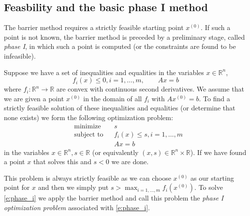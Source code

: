 \documentclass[11pt]{amsart}
\theoremstyle{definition}
\theoremstyle{remark}
\begin{document}
    \subsection{Feasbility and the basic phase I method}
        The barrier method requires a strictly feasible starting point $x^{(0)}$. If such a point is not known, the barrier method is preceded by a preliminary stage, called \emph{phase I}, in which such a point is computed (or the constraints are found to be infeasible).

        Suppose we have a set of inequalities and equalities in the variables $x \in \mathbb{R}^n$,
        \begin{equation*}
            f_i(x) \leq 0, i = 1, \dots, m, \qquad Ax = b
        \end{equation*}
        where $f_i: \mathbb{R}^n \to \mathbb{R}$ are convex with continuous second derivatives. We assume that we are given a point $x^{(0)}$ in the domain of all $f_i$ with $Ax^{(0)} = b$. To find a strictly feasible solution of these inequalities and equalities (or determine that none exists) we form the following optimization problem:
        \begin{equation}\label{e:phase_i}
            \begin{aligned}
            & {\text{minimize}} && s  \\
            & \text{subject to} && f_i(x) \leq s, i = 1, \dots, m \\
            & && Ax = b
            \end{aligned}
        \end{equation}
        in the variables $x \in \mathbb{R}^n, s \in \mathbb{R}$ (or equivalently $(x, s) \in \mathbb{R}^n \times \mathbb{R}$). If we have found a point $x$ that solves this and $s < 0$ we are done.

        This problem is always strictly feasible as we can choose $x^{(0)}$ as our starting point for $x$ and then we simply put $s > \max_{i=1, \dots, m}{f_i(x^{(0)})}$. To solve \eqref{e:phase_i} we apply the barrier method and call this problem the \emph{phase I optimization problem} associated with \eqref{e:phase_i}. 
\end{document}
